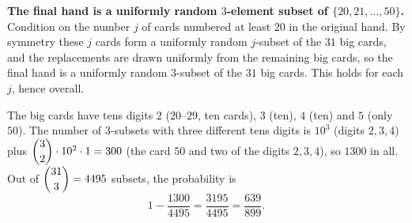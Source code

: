 \textbf{The final hand is a uniformly random $3$-element subset of $\{20,21,\dots,50\}$.} Condition on the number $j$ of cards numbered at least $20$ in the original hand. By symmetry these $j$ cards form a uniformly random $j$-subset of the $31$ big cards, and the replacements are drawn uniformly from the remaining big cards, so the final hand is a uniformly random $3$-subset of the $31$ big cards. This holds for each $j$, hence overall.

The big cards have tens digits $2$ ($20$--$29$, ten cards), $3$ (ten), $4$ (ten) and $5$ (only $50$). The number of $3$-subsets with three different tens digits is $10^3$ (digits $2,3,4$) plus $\dbinom32\cdot10^2\cdot1=300$ (the card $50$ and two of the digits $2,3,4$), so $1300$ in all. Out of $\dbinom{31}3=4495$ subsets, the probability is
\[
1-\dfrac{1300}{4495}=\dfrac{3195}{4495}=\boxed{\dfrac{639}{899}} .
\]
